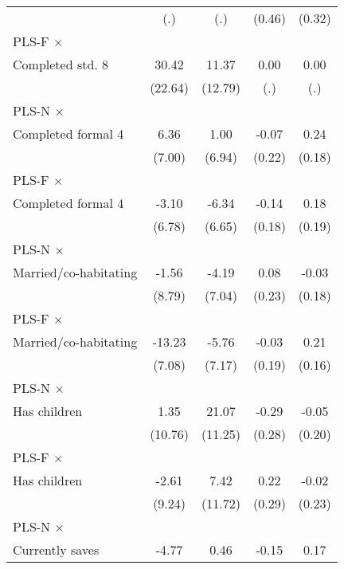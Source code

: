 \begin{table}[htbp]
\begin{tabular}{l*{4}{c}}
                &      (.)         &      (.)         &   (0.46)         &   (0.32)         \\
\addlinespace
PLS-F $\times$ \\ Completed std. 8&    30.42         &    11.37         &     0.00         &     0.00         \\
                &  (22.64)         &  (12.79)         &      (.)         &      (.)         \\
\addlinespace
PLS-N $\times$ \\ Completed formal 4&     6.36         &     1.00         &    -0.07         &     0.24         \\
                &   (7.00)         &   (6.94)         &   (0.22)         &   (0.18)         \\
\addlinespace
PLS-F $\times$ \\ Completed formal 4&    -3.10         &    -6.34         &    -0.14         &     0.18         \\
                &   (6.78)         &   (6.65)         &   (0.18)         &   (0.19)         \\
\addlinespace
PLS-N $\times$ \\ Married/co-habitating&    -1.56         &    -4.19         &     0.08         &    -0.03         \\
                &   (8.79)         &   (7.04)         &   (0.23)         &   (0.18)         \\
\addlinespace
PLS-F $\times$ \\ Married/co-habitating&   -13.23\sym{*}  &    -5.76         &    -0.03         &     0.21         \\
                &   (7.08)         &   (7.17)         &   (0.19)         &   (0.16)         \\
\addlinespace
PLS-N $\times$ \\ Has children&     1.35         &    21.07\sym{*}  &    -0.29         &    -0.05         \\
                &  (10.76)         &  (11.25)         &   (0.28)         &   (0.20)         \\
\addlinespace
PLS-F $\times$ \\ Has children&    -2.61         &     7.42         &     0.22         &    -0.02         \\
                &   (9.24)         &  (11.72)         &   (0.29)         &   (0.23)         \\
\addlinespace
PLS-N $\times$ \\ Currently saves&    -4.77         &     0.46         &    -0.15         &     0.17         \\

\end{tabular}
\end{table}
